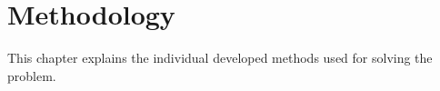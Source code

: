 \chapter{Methodology}
\label{cha:methodology}

This chapter explains the individual developed methods used for solving the problem. 


\lipsum[1-5]